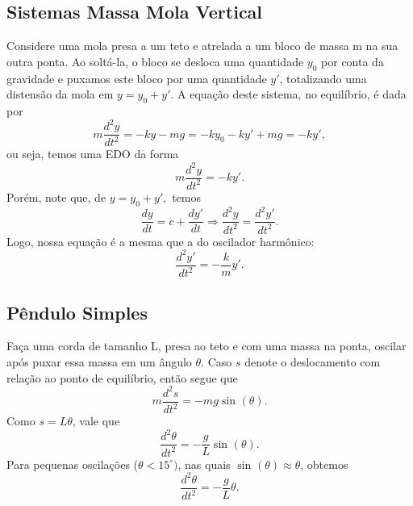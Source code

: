\documentclass[physicsII_notes.tex]{subfiles}
\begin{document}
\subsection{Sistemas Massa Mola Vertical}

Considere uma mola presa a um teto e atrelada a um bloco de massa m na sua outra ponta. Ao soltá-la, o bloco
se desloca uma quantidade \(y_{0}\) por conta da gravidade e puxamos este bloco por uma quantidade \(y'\), totalizando
uma distensão da mola em \(y = y_{0}+y'.\) A equação deste sistema, no equilíbrio, é dada por
\[
	m \frac{d^{2}y}{dt^{2}} = -ky - mg = -ky_{0}-ky'+mg = - ky',
\]
ou seja, temos uma EDO da forma
\[
	m \frac{d^{2}y}{dt^{2}} = -ky'.
\]
Porém, note que, de \(y=y_{0} + y',\) temos
\[
	\frac{dy}{dt} = c + \frac{dy'}{dt} \Rightarrow \frac{d^{2}y}{dt^{2}} = \frac{d^{2}y'}{dt^{2}}.
\]
Logo, nossa equação é a mesma que a do oscilador harmônico:
\[
	\frac{d^{2}y'}{dt^{2}} = -\frac{k}{m}y'.
\]
\subsection{Pêndulo Simples}
Faça uma corda de tamanho L, presa ao teto e com uma massa na ponta, oscilar após puxar essa massa em um ângulo \(\theta \).
Caso \(s\) denote o deslocamento com relação ao ponto de equilíbrio, então segue que
\[
	m \frac{d^{2}s}{dt^{2}} = -mg\sin^{}{(\theta )}.
\]
Como \(s = L\theta \), vale que
\[
	\frac{d^{2}\theta }{dt^{2}}=-\frac{g}{L}\sin^{}{(\theta )}.
\]
Para pequenas oscilações (\(\theta < 15^{\circ})\), nas quais \(\sin^{}{(\theta )}\approx \theta \), obtemos
\[
	\frac{d^{2}\theta }{dt^{2}} = -\frac{g}{L}\theta .
\]
\end{document}
